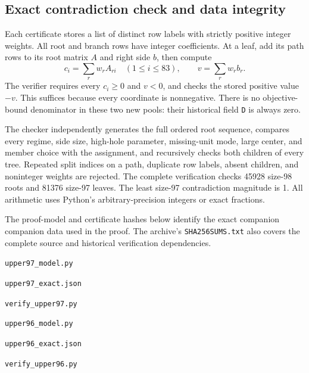 \documentclass[11pt,a4paper]{article}
\theoremstyle{remark}
\begin{document}
\subsection{Exact contradiction check and data integrity}
Each certificate stores a list of distinct row labels with strictly
positive integer weights. All root and branch rows have integer
coefficients. At a leaf, add its path rows to its root matrix $A$ and
right side $b$, then compute
\[
 c_i=\sum_r w_rA_{ri}\quad(1\leq i\leq83),\qquad
 v=\sum_r w_rb_r.
\]
The verifier requires every $c_i\geq0$ and $v<0$, and checks the stored
positive value $-v$. This suffices because every coordinate is nonnegative.
There is no objective-bound denominator in these two new pools: their
historical field \texttt{D} is always zero.

The checker independently generates the full ordered root sequence,
compares every regime, side size, high-hole parameter, missing-unit mode,
large center, and member choice with the assignment, and recursively
checks both children of every tree. Repeated split indices on a path,
duplicate row labels, absent children, and noninteger weights are rejected.
The complete verification checks 45928 size-98 roots and 81376 size-97 leaves.
The least size-97 contradiction magnitude is 1. All arithmetic uses
Python's arbitrary-precision integers or exact fractions.

The proof-model and certificate hashes below identify the exact companion
companion data used in the proof. The archive's \texttt{SHA256SUMS.txt} also
covers the complete source and historical verification dependencies.

\noindent\texttt{upper97\_model.py}\par{}\par\smallskip
\noindent\texttt{upper97\_exact.json}\par{}\par\smallskip
\noindent\texttt{verify\_upper97.py}\par{}\par\smallskip
\noindent\texttt{upper96\_model.py}\par{}\par\smallskip
\noindent\texttt{upper96\_exact.json}\par{}\par\smallskip
\noindent\texttt{verify\_upper96.py}\par{}\par\smallskip
\end{document}
